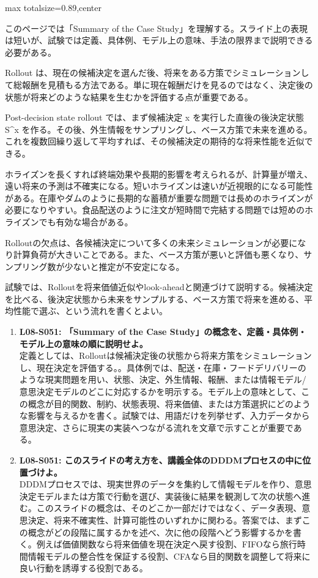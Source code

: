 \begin{minipage}[t]{0.58\textwidth}
\begin{adjustbox}{max totalsize={\textwidth}{0.89\textheight},center}
\begin{minipage}{\textwidth}\scriptsize
{}このページでは「Summary of the Case Study」を理解する。スライド上の表現は短いが、試験では定義、具体例、モデル上の意味、手法の限界まで説明できる必要がある。\par
Rollout は、現在の候補決定を選んだ後、将来をある方策でシミュレーションして総報酬を見積もる方法である。単に現在報酬だけを見るのではなく、決定後の状態が将来どのような結果を生むかを評価する点が重要である。\par
Post-decision state rollout では、まず候補決定 x を実行した直後の後決定状態 S\textasciicircum{}x を作る。その後、外生情報をサンプリングし、ベース方策で未来を進める。これを複数回繰り返して平均すれば、その候補決定の期待的な将来性能を近似できる。\par
ホライズンを長くすれば終端効果や長期的影響を考えられるが、計算量が増え、遠い将来の予測は不確実になる。短いホライズンは速いが近視眼的になる可能性がある。在庫やダムのように長期的な蓄積が重要な問題では長めのホライズンが必要になりやすい。食品配送のように注文が短時間で完結する問題では短めのホライズンでも有効な場合がある。\par
Rolloutの欠点は、各候補決定について多くの未来シミュレーションが必要になり計算負荷が大きいことである。また、ベース方策が悪いと評価も悪くなり、サンプリング数が少ないと推定が不安定になる。\par
試験では、Rolloutを将来価値近似やlook-aheadと関連づけて説明する。候補決定を比べる、後決定状態から未来をサンプルする、ベース方策で将来を進める、平均性能で選ぶ、という流れを書くとよい。\par{}\begin{enumerate}\item \textbf{L08-S051: 「Summary of the Case Study」の概念を、定義・具体例・モデル上の意味の順に説明せよ。}\\定義としては、Rolloutは候補決定後の状態から将来方策をシミュレーションし、現在決定を評価する。。具体例では、配送・在庫・フードデリバリーのような現実問題を用い、状態、決定、外生情報、報酬、または情報モデル/意思決定モデルのどこに対応するかを明示する。モデル上の意味として、この概念が目的関数、制約、状態表現、将来価値、または方策選択にどのような影響を与えるかを書く。試験では、用語だけを列挙せず、入力データから意思決定、さらに現実の実装へつながる流れを文章で示すことが重要である。\item \textbf{L08-S051: このスライドの考え方を、講義全体のDDDMプロセスの中に位置づけよ。}\\DDDMプロセスでは、現実世界のデータを集約して情報モデルを作り、意思決定モデルまたは方策で行動を選び、実装後に結果を観測して次の状態へ進む。このスライドの概念は、そのどこか一部だけではなく、データ表現、意思決定、将来不確実性、計算可能性のいずれかに関わる。答案では、まずこの概念がどの段階に属するかを述べ、次に他の段階へどう影響するかを書く。例えば価値関数なら将来価値を現在決定へ戻す役割、FIFOなら旅行時間情報モデルの整合性を保証する役割、CFAなら目的関数を調整して将来に良い行動を誘導する役割である。\end{enumerate}

\end{minipage}
\end{adjustbox}
\end{minipage}

